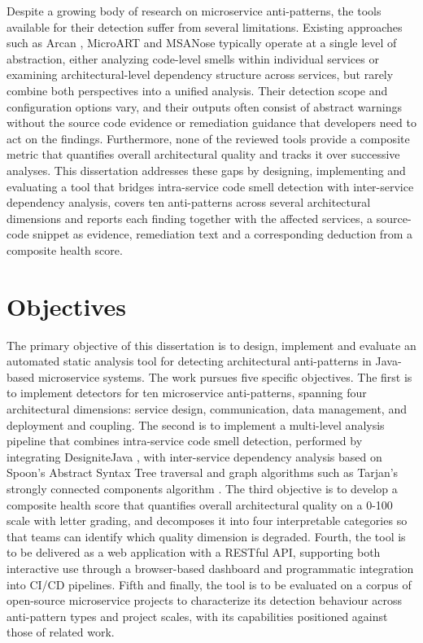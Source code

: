 \par Despite a growing body of research on microservice anti-patterns, the tools available for their detection suffer from several limitations. Existing approaches such as Arcan \cite{Arcelli2017}, MicroART \cite{Granchelli2017} and MSANose \cite{Walker2020} typically operate at a single level of abstraction, either analyzing code-level smells within individual services or examining architectural-level dependency structure across services, but rarely combine both perspectives into a unified analysis. Their detection scope and configuration options vary, and their outputs often consist of abstract warnings without the source code evidence or remediation guidance that developers need to act on the findings. Furthermore, none of the reviewed tools provide a composite metric that quantifies overall architectural quality and tracks it over successive analyses. This dissertation addresses these gaps by designing, implementing and evaluating a tool that bridges intra-service code smell detection with inter-service dependency analysis, covers ten anti-patterns across several architectural dimensions and reports each finding together with the affected services, a source-code snippet as evidence, remediation text and a corresponding deduction from a composite health score.

\section{Objectives}
\label{sec:objectives}

\par The primary objective of this dissertation is to design, implement and evaluate an automated static analysis tool for detecting architectural anti-patterns in Java-based microservice systems. The work pursues five specific objectives. The first is to implement detectors for ten microservice anti-patterns, spanning four architectural dimensions: service design, communication, data management, and deployment and coupling. The second is to implement a multi-level analysis pipeline that combines intra-service code smell detection, performed by integrating DesigniteJava \cite{Sharma2024}, with inter-service dependency analysis based on Spoon's Abstract Syntax Tree traversal \cite{Pawlak2016} and graph algorithms such as Tarjan's strongly connected components algorithm \cite{Tarjan1972}. The third objective is to develop a composite health score that quantifies overall architectural quality on a 0-100 scale with letter grading, and decomposes it into four interpretable categories so that teams can identify which quality dimension is degraded. Fourth, the tool is to be delivered as a web application with a RESTful API, supporting both interactive use through a browser-based dashboard and programmatic integration into CI/CD pipelines. Fifth and finally, the tool is to be evaluated on a corpus of open-source microservice projects to characterize its detection behaviour across anti-pattern types and project scales, with its capabilities positioned against those of related work.

